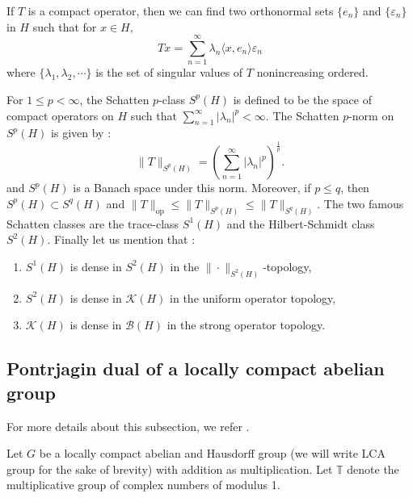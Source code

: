 \documentclass[11pt,a4paper]{amsart}
\begin{document}
If $T$ is a compact operator, then we can find two orthonormal  sets  $\{e_n\}$  and  $\{\varepsilon_n\}$ in $H$ such that for $x\in H$, 
\begin{equation}
Tx=\sum_{n=1}^\infty\lambda_n \langle x, e_n\rangle \varepsilon_n
\end{equation}
where  $\{\lambda_1, \lambda_2,\cdots\}$ is  the set of  singular values of $T$ nonincreasing ordered. 

For $1\leq p<\infty$, the Schatten $p$-class $S^p(H)$ is defined to be the space of compact operators on $H$ such that $\sum_{n=1}^\infty |\lambda_n|^p<\infty$. The  Schatten $p$-norm on $S^p(H)$ is given by :
\begin{equation}
\|T\|_{S^p(H)}=\left(\sum_{n=1}^\infty |\lambda_n|^p\right)^{\frac{1}{p}}. 
\end{equation}
and $S^p(H)$ is a Banach space under this norm. 
Moreover, if $p\leq q$, then $S^p(H)\subset S^q(H)$ and $\|T\|_{\mbox{op}}\leq \|T\|_{S^p(H)}\leq \|T\|_{S^q(H)}$. 
The two famous Schatten classes are the trace-class $S^1(H)$ and the Hilbert-Schmidt class $S^2(H)$.  Finally let us mention that :
\begin{enumerate}
\item[i)] $S^1(H)$ is dense in $S^2(H)$ in the $\|\cdot\|_{S^2(H)}$-topology,
\item[ii)] $S^2(H)$ is dense in $\mathcal{K}(H)$ in the uniform operator topology,
\item[iii)] $\mathcal{K}(H)$ is dense in $\mathcal{B}(H)$ in the strong operator topology.
\end{enumerate}

\subsection{Pontrjagin dual of a locally compact abelian group}
For more details about this subsection, we refer \cite{Hewitt, Rudin}.  

Let $G$ be a locally compact abelian  and Hausdorff group (we will write LCA group for the sake of brevity) with addition as multiplication.
Let  $\mathbb{T}$ denote the multiplicative group of complex numbers of modulus 1. 
\end{document}
